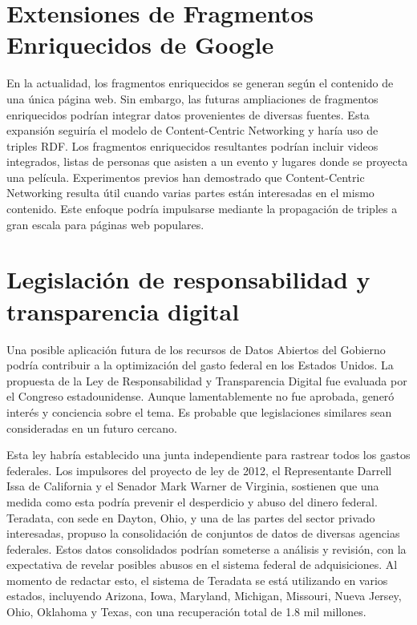 \documentclass[11pt]{report}
\begin{document}
\section{Extensiones de Fragmentos Enriquecidos de Google}

		En la actualidad, los fragmentos enriquecidos se generan según el contenido de una única página web. Sin embargo, las futuras ampliaciones de fragmentos enriquecidos podrían integrar datos provenientes de diversas fuentes. Esta expansión seguiría el modelo de Content-Centric Networking y haría uso de triples RDF. Los fragmentos enriquecidos resultantes podrían incluir videos integrados, listas de personas que asisten a un evento y lugares donde se proyecta una película. Experimentos previos han demostrado que Content-Centric Networking resulta útil cuando varias partes están interesadas en el mismo contenido. Este enfoque podría impulsarse mediante la propagación de triples a gran escala para páginas web populares.
\section{Legislación de responsabilidad y transparencia digital}

		Una posible aplicación futura de los recursos de Datos Abiertos del Gobierno podría contribuir a la optimización del gasto federal en los Estados Unidos. La propuesta de la Ley de Responsabilidad y Transparencia Digital fue evaluada por el Congreso estadounidense. Aunque lamentablemente no fue aprobada, generó interés y conciencia sobre el tema. Es probable que legislaciones similares sean consideradas en un futuro cercano. 
  
        Esta ley habría establecido una junta independiente para rastrear todos los gastos federales. Los impulsores del proyecto de ley de 2012, el Representante Darrell Issa de California y el Senador Mark Warner de Virginia, sostienen que una medida como esta podría prevenir el desperdicio y abuso del dinero federal. Teradata, con sede en Dayton, Ohio, y una de las partes del sector privado interesadas, propuso la consolidación de conjuntos de datos de diversas agencias federales. Estos datos consolidados podrían someterse a análisis y revisión, con la expectativa de revelar posibles abusos en el sistema federal de adquisiciones. Al momento de redactar esto, el sistema de Teradata se está utilizando en varios estados, incluyendo Arizona, Iowa, Maryland, Michigan, Missouri, Nueva Jersey, Ohio, Oklahoma y Texas, con una recuperación total de 1.8 mil millones.
\end{document}
